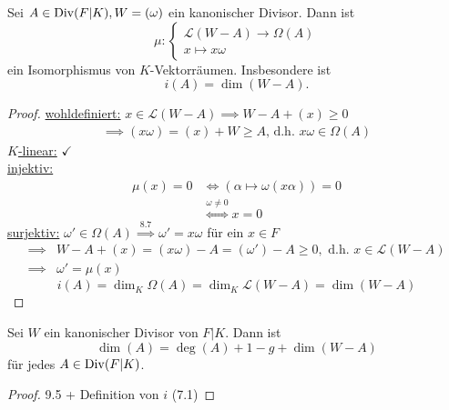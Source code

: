\begin{satz}
    Sei $A \in \operatorname{Div}(F|K), W = (\omega)$ ein kanonischer Divisor.
    Dann ist
    $$ \mu: \begin{cases}
        \mathcal{L}(W-A) \to \Omega(A)\\
        x \mapsto x\omega
    \end{cases}$$
    ein Isomorphismus von $K$-Vektorräumen.
    Insbesondere ist $$i(A) = \dim (W-A).$$
\end{satz}
\begin{proof}
    \underline{wohldefiniert:} $x \in \mathcal{L}(W-A) \implies W-A + (x) \geq 0$
    \begin{align*}
        \implies (x\omega) = (x) + W \geq A \text{, d.h. } x\omega\in\Omega(A)
    \end{align*}
    \underline{$K$-linear:} $\checkmark$\\
    \underline{injektiv:}
    \begin{align*}
        \mu(x) = 0 &\iff \left(\alpha \mapsto \omega(x\alpha)\right) = 0\\
            &\overset{\omega \ne 0}{\iff} x = 0
    \end{align*}
    \underline{surjektiv:} $\omega'\in\Omega(A) \stackrel{8.7}{\implies} \omega'=x\omega$ für ein $x \in F$
    \begin{align*}
        \implies& W-A + (x) = (x\omega) - A = (\omega') -A \geq 0, \text{ d.h. } x \in \mathcal{L}(W-A)\\
        \implies& \omega' = \mu(x)
    \end{align*}
    $$ i(A) = \dim_K\Omega(A) = \dim_K \mathcal{L}(W-A) = \dim (W-A)$$
\end{proof}

\begin{theorem}
    Sei $W$ ein kanonischer Divisor von $F|K$. Dann ist
    $$ \dim (A) = \deg (A) + 1 - g + \dim (W-A)$$
    für jedes $A \in \operatorname{Div}(F|K)$.
\end{theorem}
\begin{proof}
    9.5 + Definition von $i$ (7.1)
\end{proof}

